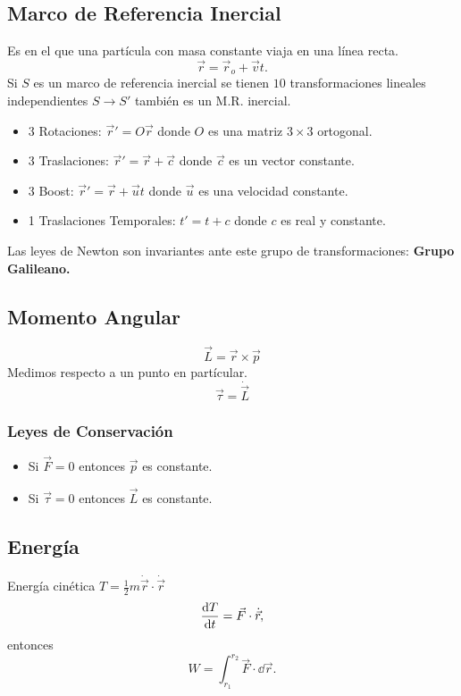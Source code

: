 \subsection{Marco de Referencia Inercial}
Es en el que una partícula con masa constante viaja en una línea recta.
\begin{equation}
	\vec{r} = \vec{r}_o + \vec{v} t.
\end{equation}
Si $S$ es un marco de referencia inercial se tienen $10$ transformaciones lineales independientes $S \to S\prime$ también es un M.R. inercial.
\begin{itemize}
	\item 3 Rotaciones: $\vec{r}' = O \vec{r}$ donde $O$ es una matriz $3\times 3$ ortogonal.
	\item 3 Traslaciones: $\vec{r}' = \vec{r} + \vec{c}$ donde $\vec{c}$ es un vector constante.
	\item 3 Boost: $\vec{r}' = \vec{r} + \vec{u} t$ donde $\vec{u}$ es una velocidad constante.
	\item 1 Traslaciones Temporales: $t' = t + c$ donde $c$ es real y constante.
\end{itemize}
Las leyes de Newton son invariantes ante este grupo de transformaciones: \textbf{Grupo Galileano.}


\subsection{Momento Angular}
\begin{equation}
	\vec{L} = \vec{r} \times \vec{p}
\end{equation}
Medimos respecto a un punto en partícular.
\begin{equation}
	\vec{\tau} = \dot{\vec{L}}
\end{equation}

\subsubsection{Leyes de Conservación}
\begin{itemize}
	\item Si $\vec{F} = 0$ entonces $\vec{p}$ es constante.
	\item Si $\vec{\tau} = 0$ entonces $\vec{L}$ es constante.
\end{itemize}

\subsection{Energía}
Energía cinética $T = \frac{1}{2} m \dot{\vec{r}} \cdot \dot{\vec{r}}$
\begin{equation}
	\dv{T}{t} = \vec{F} \cdot \dot{\vec{r}},
\end{equation}
entonces
\begin{equation}
	W = \int _{r_1} ^{r_2} \vec{F} \cdot \dd{\vec{r}}.
\end{equation}

